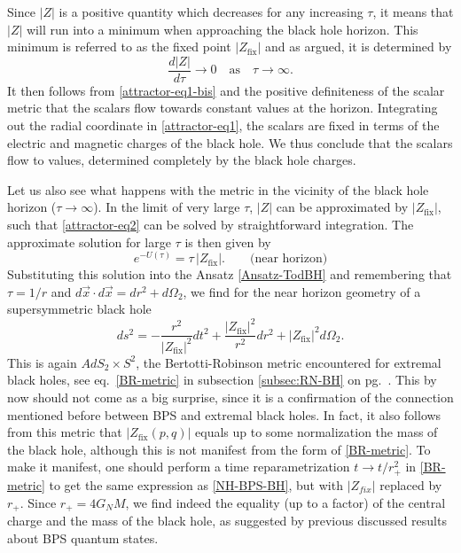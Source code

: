 \documentclass[12pt,twoside]{book}
\begin{document}
Since $|Z|$ is a positive quantity which decreases for any increasing $\tau$, it means that $|Z|$ will run into a minimum when approaching the black hole horizon. This minimum is referred to as the fixed point $|Z_{\mathrm{fix}}|$ and as argued, it is determined by
%
\begin{equation}
\frac{d|Z|}{d\tau} \rightarrow 0\quad \text{as} \quad \tau \rightarrow \infty.
\end{equation}
It then follows from \eqref{attractor-eq1-bis} and the positive definiteness of the scalar metric that the scalars flow towards constant values at the horizon. Integrating out the radial coordinate in \eqref{attractor-eq1}, the scalars are fixed in terms of the electric and magnetic charges of the black hole. We thus conclude that the scalars flow to values, determined completely by the black hole charges.\newline

Let us also see what happens with the metric in the vicinity of the black hole horizon ($\tau \rightarrow \infty$). In the limit of very large $\tau$, $|Z|$ can be approximated by $|Z_{\mathrm{fix}}|$, such that \eqref{attractor-eq2} can be solved by straightforward integration. The approximate solution for large $\tau$ is then given by
%
\begin{equation}
e^{-U(\tau)} = \tau\, |Z_{\mathrm{fix}}|. \qquad \text{(near horizon)}
\end{equation}
Substituting this solution into the Ansatz \eqref{Ansatz-TodBH} and remembering that $\tau = 1/r$ and $d\vec{x}\cdot d\vec{x}= dr^{2} + d\Omega_{2}$, we find for the near horizon geometry of a supersymmetric black hole
\begin{equation}\label{NH-BPS-BH}
ds^{2} = -\frac{r^{2}}{|Z_{\mathrm{fix}}|^{2}}dt^{2} + \frac{|Z_{\mathrm{fix}}|^{2}}{r^{2}}dr^{2} + |Z_{\mathrm{fix}}|^{2}d\Omega_{2}.
\end{equation}
This is again $AdS_{2} \times S^{2}$, the Bertotti-Robinson metric encountered for extremal black holes, see eq.\ \eqref{BR-metric} in subsection \ref{subsec:RN-BH} on pg.\ \pageref{BR-metric}. This by now should not come as a big surprise, since it is a confirmation of the connection mentioned before between BPS and extremal black holes. In fact, it also follows from this metric that $|Z_{\mathrm{fix}}(p,q)|$ equals up to some normalization the mass of the black hole, although this is not manifest from the form of \eqref{BR-metric}. To make it manifest, one should perform a time reparametrization $t \rightarrow t/r_{+}^{2}$ in \eqref{BR-metric} to get the same expression as \eqref{NH-BPS-BH}, but with $|Z_{fix}|$ replaced by $r_{+}$. Since $r_{+} = 4G_{N}M$, we find indeed the equality (up to a factor) of the central charge and the mass of the black hole, as suggested by previous discussed results about BPS quantum states.
\end{document}
